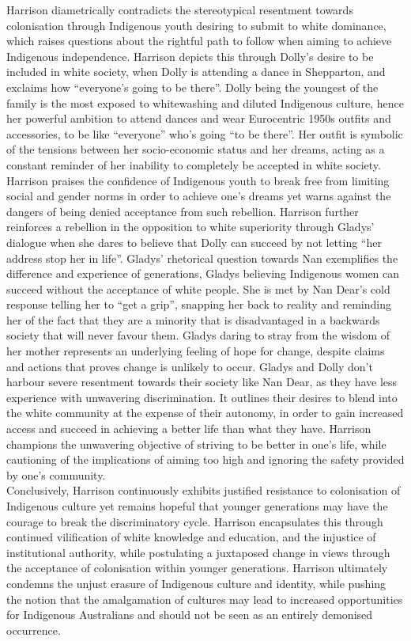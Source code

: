 \documentclass[a4paper]{article}
\begin{document}
Harrison diametrically contradicts the stereotypical resentment towards colonisation through
Indigenous youth desiring to submit to white dominance, which raises questions about the
rightful path to follow when aiming to achieve Indigenous independence. Harrison depicts
this through Dolly’s desire to be included in white society, when Dolly is attending a dance in
Shepparton, and exclaims how “everyone’s going to be there”. Dolly being the youngest of
the family is the most exposed to whitewashing and diluted Indigenous culture, hence her
powerful ambition to attend dances and wear Eurocentric 1950s outfits and accessories, to
be like “everyone” who’s going “to be there”. Her outfit is symbolic of the tensions between
her socio-economic status and her dreams, acting as a constant reminder of her inability to
completely be accepted in white society. Harrison praises the confidence of Indigenous
youth to break free from limiting social and gender norms in order to achieve one’s dreams
yet warns against the dangers of being denied acceptance from such rebellion. Harrison
further reinforces a rebellion in the opposition to white superiority through Gladys’ dialogue
when she dares to believe that Dolly can succeed by not letting “her address stop her in life”.
Gladys’ rhetorical question towards Nan exemplifies the difference and experience of
generations, Gladys believing Indigenous women can succeed without the acceptance of
white people. She is met by Nan Dear’s cold response telling her to “get a grip”, snapping
her back to reality and reminding her of the fact that they are a minority that is
disadvantaged in a backwards society that will never favour them. Gladys daring to stray
from the wisdom of her mother represents an underlying feeling of hope for change, despite
claims and actions that proves change is unlikely to occur. Gladys and Dolly don’t harbour
severe resentment towards their society like Nan Dear, as they have less experience with
unwavering discrimination. It outlines their desires to blend into the white community at the
expense of their autonomy, in order to gain increased access and succeed in achieving a
better life than what they have. Harrison champions the unwavering objective of striving to
be better in one’s life, while cautioning of the implications of aiming too high and ignoring the
safety provided by one’s community.\\

Conclusively, Harrison continuously exhibits justified resistance to colonisation of Indigenous
culture yet remains hopeful that younger generations may have the courage to break the
discriminatory cycle. Harrison encapsulates this through continued vilification of white
knowledge and education, and the injustice of institutional authority, while postulating a
juxtaposed change in views through the acceptance of colonisation within younger
generations. Harrison ultimately condemns the unjust erasure of Indigenous culture and
identity, while pushing the notion that the amalgamation of cultures may lead to increased
opportunities for Indigenous Australians and should not be seen as an entirely demonised
occurrence.\\
\end{document}
